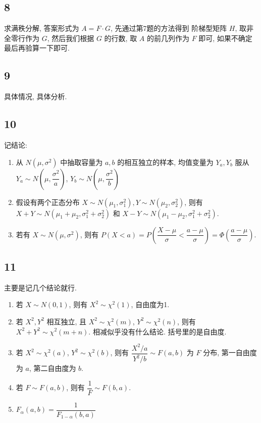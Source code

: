 \documentclass[a4paper, draft]{article}
\begin{document}
\subsection*{8}

求满秩分解, 答案形式为 $A=F\cdot G$, 
先通过第7题的方法得到 阶梯型矩阵 $H$, 
取非全零行作为 $G$, 然后我们根据 $G$ 的行数, 
取 $A$ 的前几列作为 $F$ 即可, 如果不确定最后再验算一下即可.

\subsection*{9}

具体情况, 具体分析.

\subsection*{10}

记结论:

\begin{enumerate}
    \item 从 $N(\mu,\sigma^2)$ 中抽取容量为 $a,b$ 的相互独立的样本, 
    均值变量为 $Y_a,Y_b$ 服从 $Y_a\sim N(\mu,\dfrac{\sigma^2}{a})$, 
    $Y_b\sim N(\mu,\dfrac{\sigma^2}{b})$
    \item 假设有两个正态分布 $X\sim N(\mu_1,\sigma_1^2), Y\sim N(\mu_2,\sigma_2^2)$, 
    则有 $X+Y\sim N(\mu_1+\mu_2,\sigma_1^2+\sigma_2^2)$ 
    和 $X-Y\sim N(\mu_1-\mu_2,\sigma_1^2+\sigma_2^2)$.
    \item 若有 $X\sim N(\mu,\sigma^2)$, 
    则有 $P(X<a)=P(\dfrac{X-\mu}{\sigma}<\dfrac{a-\mu}{\sigma})=\Phi(\dfrac{a-\mu}{\sigma})$.
\end{enumerate}

\subsection*{11}

主要是记几个结论就行.

\begin{enumerate}
    \item 若 $X\sim N(0,1)$, 则有 $X^2\sim \chi^2(1)$, 自由度为1.
    \item 若 $X^2,Y^2$ 相互独立, 且 $X^2\sim \chi^2(m)$, 
    $Y^2\sim \chi^2(n)$, 则有 $X^2+Y^2\sim \chi^2(m+n)$. 
    相减似乎没有什么结论. 括号里的是自由度.
    \item 若 $X^2\sim\chi^2(a)$, $Y^2\sim\chi^2(b)$, 
    则有 $\dfrac{X^2/a}{Y^2/b}\sim F(a,b)$ 为 $F$ 分布, 
    第一自由度为 $a$, 第二自由度为 $b$.
    \item 若 $F\sim F(a,b)$, 则有 $\dfrac{1}{F}\sim F(b,a)$.
    \item $F_{\alpha}(a,b)=\dfrac{1}{F_{1-\alpha}(b,a)}$
\end{enumerate}
\end{document}
